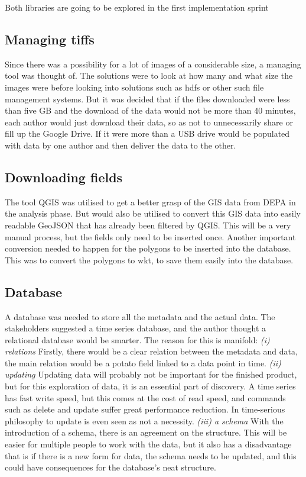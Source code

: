 Both libraries are going to be explored in the first implementation sprint

\subsection{Managing tiffs}
Since there was a possibility for a lot of images of a considerable size, a managing tool was thought of. The solutions were to look at how many and what size the images were before looking into solutions such as \acrfull{hdfs} or other such file management systems. 
But it was decided that if the files downloaded were less than five \acrfull{GB} and the download of the data would not be more than 40 minutes, each author would just download their data, so as not to unnecessarily share or fill up the Google Drive. If it were more than a USB drive would be populated with data by one author and then deliver the data to the other. 


\subsection{Downloading fields}
The tool QGIS was utilised to get a better grasp of the \acrfull{GIS} data from DEPA in the analysis phase. But would also be utilised to convert this GIS data into easily readable GeoJSON that has already been filtered by QGIS. This will be a very manual process, but the fields only need to be inserted once.
Another important conversion needed to happen for the polygons to be inserted into the database. This was to convert the polygons to \acrfull{wkt}, to save them easily into the database. 

\subsection{Database}
A database was needed to store all the metadata and the actual data.
The stakeholders suggested a time series database, and the author thought a relational database would be smarter. The reason for this is manifold: \textit{(i) relations} Firstly, there would be a clear relation between the metadata and data, the main relation would be a potato field linked to a data point in time. \textit{(ii) updating} Updating data will probably not be important for the finished product, but for this exploration of data, it is an essential part of discovery. A time series has fast write speed, but this comes at the cost of read speed, and commands such as delete and update suffer great performance reduction. In time-serious philosophy to update is even seen as not a necessity. \textit{(iii) a schema} With the introduction of a schema, there is an agreement on the structure. This will be easier for multiple people to work with the data, but it also has a disadvantage that is if there is a new form for data, the schema needs to be updated, and this could have consequences for the database's neat structure. 

